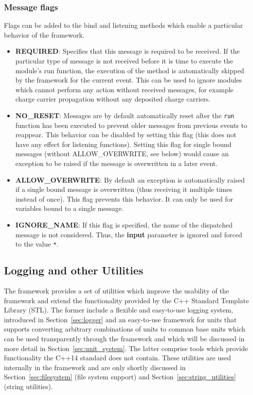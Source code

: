 \subsubsection{Message flags}
Flags can be added to the bind and listening methods which enable a particular behavior of the framework.
\begin{itemize}
\item \textbf{REQUIRED}: Specifies that this message is required to be received.
If the particular type of message is not received before it is time to execute the module's run function, the execution of the method is automatically skipped by the framework for the current event.
This can be used to ignore modules which cannot perform any action without received messages, for example charge carrier propagation without any deposited charge carriers.
\item \textbf{NO\_RESET}: Messages are by default automatically reset after the \texttt{run} function has been executed to prevent older messages from previous events to reappear.
This behavior can be disabled by setting this flag (this does not have any effect for listening functions).
Setting this flag for single bound messages (without ALLOW\_OVERWRITE, see below) would cause an exception to be raised if the message is overwritten in a later event.
\item \textbf{ALLOW\_OVERWRITE}: By default an exception is automatically raised if a single bound message is overwritten (thus receiving it multiple times instead of once).
This flag prevents this behavior.
It can only be used for variables bound to a single message.
\item \textbf{IGNORE\_NAME}: If this flag is specified, the name of the dispatched message is not considered.
Thus, the \textbf{input} parameter is ignored and forced to the value \texttt{*}.
\end{itemize}

\subsection{Logging and other Utilities}
\label{sec:logging_utilities}
The \apsq framework provides a set of utilities which improve the usability of the framework and extend the functionality provided by the C++ Standard Template Library (STL).
The former include a flexible and easy-to-use logging system, introduced in Section~\ref{sec:logger} and an easy-to-use framework for units that supports converting arbitrary combinations of units to common base units which can  be used transparently through the framework and which will be discussed in more detail in Section~\ref{sec:unit_system}.
The latter comprise tools which provide functionality the C++14 standard does not contain.
These utilities are used internally in the framework and are only shortly discussed in Section~\ref{sec:filesystem} (file system support) and Section~\ref{sec:string_utilities} (string utilities).

